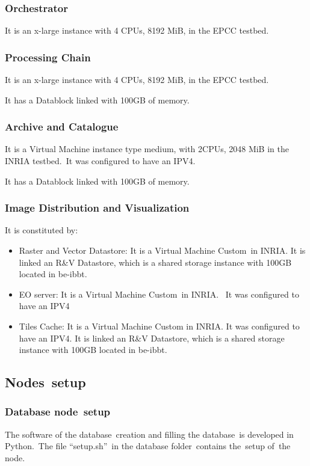 \documentclass[a4paper]{article}
\newcommand\liststyleLFOxlv{%
\renewcommand\labelitemi{[F0B7?]}
\renewcommand\labelitemii{o}
\renewcommand\labelitemiii{[F0A7?]}
\renewcommand\labelitemiv{[F0B7?]}
}
\begin{document}
\subsubsection[Orchestrator]{Orchestrator}
\hypertarget{Toc390097019}{}It is an x-large instance with 4 CPUs, 8192
MiB, in the EPCC testbed.

\subsubsection[Processing Chain]{Processing Chain}
\hypertarget{Toc390097020}{}It is an x-large instance with 4 CPUs, 8192
MiB, in the EPCC testbed.\ 


\bigskip

It has a Datablock linked with 100GB of memory.

\subsubsection[Archive and Catalogue]{Archive and Catalogue}
\hypertarget{Toc390097021}{}It is a Virtual Machine instance type
medium, with 2CPUs, 2048 MiB in the INRIA testbed.\ It was configured
to have an IPV4.


\bigskip

It has a Datablock linked with 100GB of memory.\ 

\subsubsection[Image Distribution and Visualization]{Image Distribution
and Visualization}
\hypertarget{Toc390097022}{}It is constituted by:

\liststyleLFOxlv
\begin{itemize}
\item Raster and Vector Datastore: It is a Virtual Machine Custom\ in
INRIA. It is linked an R\&V Datastore, which is a shared storage
instance with 100GB located in be-ibbt.\ 
\item EO server: It is a Virtual Machine Custom\ in INRIA. \ It was
configured to have an IPV4
\item Tiles Cache: It is a Virtual Machine Custom in INRIA. It was
configured to have an IPV4. It is linked an R\&V Datastore, which is a
shared storage instance with 100GB located in be-ibbt.
\end{itemize}
\subsection[Nodes\ setup]{Nodes\ setup}
\hypertarget{Toc390097023}{}\subsubsection[Database
node\ setup]{Database node\ setup}
\hypertarget{Toc390097024}{}The software of the database\ creation and
filling the database\ is developed in Python.\ The file
{\textquotedblleft}setup.sh{\textquotedblright}\ in the database
folder\ contains the\ setup of\ the node.
\end{document}
